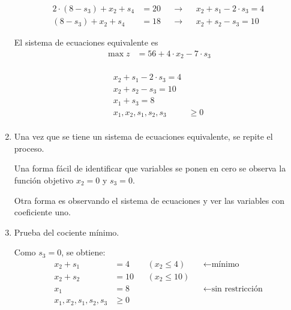\documentclass[../main.tex]{subfiles}
\begin{document}
\begin{example}
\begin{enumerate}
                    \begin{equation}
                        \begin{aligned}
                          2 \cdot (8 - s_3) + x_2 + s_4 &= 20 && \longrightarrow && x_2 + s_1 -2 \cdot s_3 = 4 \\
                            (8 - s_3) + x_2 + s_4 &= 18 && \longrightarrow && x_2 + s_2 - s_3 = 10 
                        \end{aligned}
                    \end{equation}

                    El sistema de ecuaciones equivalente es
                    \begin{equation}
                        \begin{split}
                            \max z &= 56 + 4 \cdot x_2 - 7 \cdot s_3 \\
                        \end{split}
                    \end{equation}

                    \begin{equation}
                        \begin{aligned}
                          x_2 + s_1 -2 \cdot s_3 = 4 \\
                          x_2 + s_2 - s_3 = 10 \\
                          x_1 + s_3 = 8 \\
                            x_1, x_2, s_1, s_2, s_3 &\geq 0 \\
                        \end{aligned}
                    \end{equation}
                \item Una vez que se tiene un sistema de ecuaciones equivalente, se repite el proceso.
                    
                    Una forma fácil de identificar que variables se ponen en cero se observa la función objetivo $x_2 = 0$ y $s_3 = 0$.

                    Otra forma es observando el sistema de ecuaciones y ver las variables con coeficiente uno.
                \item Prueba del cociente mínimo.
                
                    Como $s_3=0$, se obtiene:
                    \begin{equation}
                        \begin{aligned}
                            x_2 + s_1 &= 4 && (x_2 \leq 4) && \leftarrow \text{mínimo} \\
                            x_2 + s_2 &= 10 && (x_2 \leq 10)\\
                            x_1 &= 8 &&  && \leftarrow \text{sin restricción}\\
                            x_1, x_2, s_1, s_2, s_3 &\geq 0 \\
                        \end{aligned}
                    \end{equation}


\end{enumerate}
\end{example}
\end{document}
